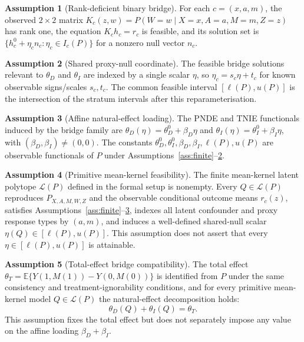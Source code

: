 \documentclass[11pt]{article}
\newcommand{\E}{\mathbb{E}}
\theoremstyle{definition}
\newtheorem{assumption}{Assumption}
\theoremstyle{plain}
\theoremstyle{remark}
\begin{document}
\begin{assumption}[Rank-deficient binary bridge]\label{ass:rank-def}
For each \(c=(x,a,m)\), the observed \(2\times2\) matrix
\(K_c(z,w)=P(W=w\mid X=x,A=a,M=m,Z=z)\) has rank one, the equation
\(K_c h_c=r_c\) is feasible, and its solution set is
\(\{h_c^0+\eta_c n_c:\eta_c\in I_c(P)\}\) for a nonzero null vector \(n_c\).
\end{assumption}

\begin{assumption}[Shared proxy-null coordinate]\label{ass:shared-null}
The feasible bridge solutions relevant to \(\theta_D\) and \(\theta_I\) are
indexed by a single scalar \(\eta\), so \(\eta_c=s_c\eta+t_c\) for known
observable signs/scales \(s_c,t_c\).  The common feasible interval
\([\ell(P),u(P)]\) is the intersection of the stratum intervals after this
reparameterisation.
\end{assumption}

\begin{assumption}[Affine natural-effect loading]\label{ass:affine-loading}
The PNDE and TNIE functionals induced by the bridge family are
\(\theta_D(\eta)=\theta_D^0+\beta_D\eta\) and
\(\theta_I(\eta)=\theta_I^0+\beta_I\eta\), with
\((\beta_D,\beta_I)\neq(0,0)\).  The constants
\(\theta_D^0,\theta_I^0,\beta_D,\beta_I,\ell(P),u(P)\) are observable
functionals of \(P\) under Assumptions~\ref{ass:finite}--\ref{ass:shared-null}.
\end{assumption}

\begin{assumption}[Primitive mean-kernel feasibility]\label{ass:latent-polytope}
The finite mean-kernel latent polytope \(\mathcal{L}(P)\) defined in the
formal setup is nonempty.  Every \(Q\in\mathcal{L}(P)\) reproduces
\(P_{X,A,M,W,Z}\) and the observable conditional outcome means \(r_c(z)\),
satisfies Assumptions~\ref{ass:finite}--\ref{ass:affine-loading}, indexes all
latent confounder and proxy response types by \((a,m)\), and induces a
well-defined shared-null scalar \(\eta(Q)\in[\ell(P),u(P)]\).  This assumption
does not assert that every \(\eta\in[\ell(P),u(P)]\) is attainable.
\end{assumption}

\begin{assumption}[Total-effect bridge compatibility]\label{ass:total-effect}
The total effect \(\theta_T=\E\{Y(1,M(1))-Y(0,M(0))\}\) is identified from
\(P\) under the same consistency and treatment-ignorability conditions, and
for every primitive mean-kernel model \(Q\in\mathcal{L}(P)\) the natural-effect
decomposition holds:
\[
  \theta_D(Q)+\theta_I(Q)=\theta_T.
\]
This assumption fixes the total effect but does not separately impose any
value on the affine loading \(\beta_D+\beta_I\).
\end{assumption}
\end{document}
